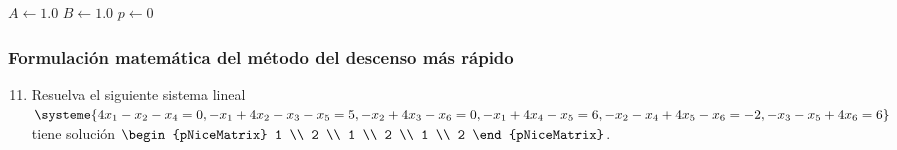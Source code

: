 \begin{frame}
	\begin{algorithm}[H]
		$A\leftarrow 1.0$\;
		$B\leftarrow 1.0$\;
		$p\leftarrow 0$\;
	\end{algorithm}
\end{frame}

\begin{frame}
	\frametitle{Formulación matemática del método del descenso más rápido}
\end{frame}

\begin{frame}
	\begin{enumerate}\setcounter{enumi}{10}
		\item

		      Resuelva el siguiente sistema lineal
		      \begin{math}
			      \systeme{
			      4x_{1}-
			      x_{2}-
			      x_{4}=
			      0,
			      -x_{1}+
			      4x_{2}-
			      x_{3}-
			      x_{5}=
			      5,
			      -x_{2}+
			      4x_{3}-
			      x_{6}=
			      0,
			      -x_{1}+
			      4x_{4}-
			      x_{5}=
			      6,
			      -x_{2}-
			      x_{4}+
			      4x_{5}-
			      x_{6}=
			      -2,
			      -x_{3}-
			      x_{5}+
			      4x_{6}=
			      6
			      }
		      \end{math}
		      tiene solución
		      \begin{math}
			      \begin{pNiceMatrix}
				      1 \\
				      2 \\
				      1 \\
				      2 \\
				      1 \\
				      2
			      \end{pNiceMatrix}
		      \end{math}.


\end{enumerate}
\end{frame}
